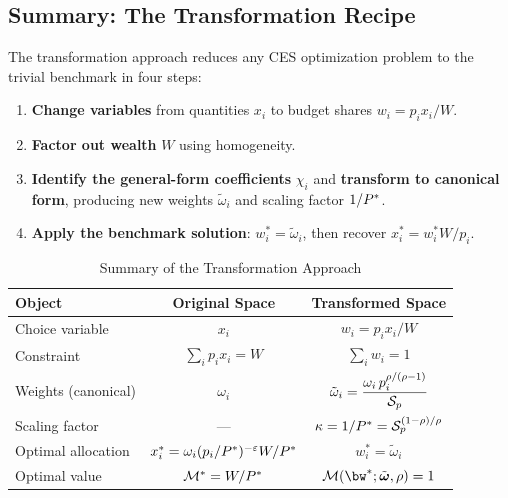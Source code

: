 \subsection{Summary: The Transformation Recipe}
\label{subsec:transform-summary}

The transformation approach reduces any CES optimization problem to the trivial benchmark in four steps:

\begin{enumerate}[leftmargin=2em]
\item \textbf{Change variables} from quantities $x_i$ to budget shares $w_i = p_i x_i / W$.
\item \textbf{Factor out wealth} $W$ using homogeneity.
\item \textbf{Identify the general-form coefficients} $\chi_i$ and \textbf{transform to canonical form}, producing new weights $\tilde{\omega}_i$ and scaling factor $1/P^{*}$.
\item \textbf{Apply the benchmark solution}: $w_i^* = \tilde{\omega}_i$, then recover $x_i^* = w_i^* W / p_i$.
\end{enumerate}

\begin{table}[H]
\centering
\caption{Summary of the Transformation Approach}
\label{tab:transform-summary}
\begin{tabular}{@{}lcc@{}}
\toprule
\textbf{Object} & \textbf{Original Space} & \textbf{Transformed Space} \\
\midrule
Choice variable & $x_i$ & $w_i = p_i x_i / W$ \\[4pt]
Constraint & $\sum_i p_i x_i = W$ & $\sum_i w_i = 1$ \\[4pt]
Weights (canonical) & $\omega_i$ & $\tilde{\omega}_i = \dfrac{\omega_i \, p_i^{\rho/(\rho-1)}}{\mathcal{S}_p}$ \\[12pt]
Scaling factor & --- & $\kappa = 1/P^{*} = \mathcal{S}_p^{(1-\rho)/\rho}$ \\[4pt]
Optimal allocation & $x_i^* = \omega_i (p_i/P^{*})^{-\varepsilon} W/P^{*}$ & $w_i^* = \tilde{\omega}_i$ \\[4pt]
Optimal value & $\mathcal{M}^* = W/P^{*}$ & $\M(\bw^*; \tilde{\bom}, \rho) = 1$ \\
\bottomrule
\end{tabular}
\end{table}

